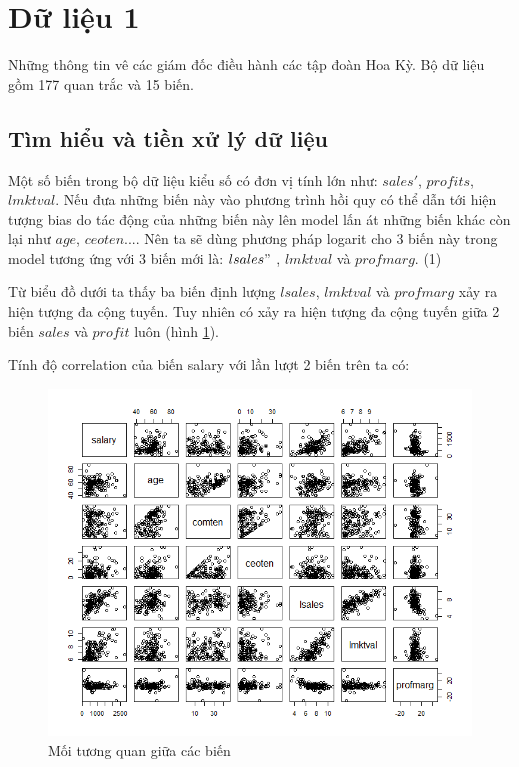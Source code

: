 \section{Dữ liệu 1}
Những thông tin vê các giám đốc điều hành các tập đoàn Hoa Kỳ. Bộ dữ liệu gồm 177 quan trắc và 15 biến.

\subsection*{Tìm hiểu và tiền xử lý dữ liệu}

Một số biến trong bộ dữ liệu kiểu số có đơn vị tính lớn như: $sales'$, $profits$, $lmktval$. Nếu đưa những biến này vào phương trình hồi quy có thể dẫn tới hiện tượng bias do tác động của những biến này lên model lấn át những biến khác còn lại như $age$, $ceoten$.... Nên ta sẽ dùng phương pháp logarit cho 3 biến này trong model tương ứng với 3 biến mới là:  $lsales"$ , $lmktval$   và $profmarg$. (1)


Từ biểu đồ dưới ta thấy ba biến định lượng $\textit{lsales}$, $\textit{lmktval}$ và $\textit{profmarg}$ xảy ra hiện tượng đa cộng tuyến.
Tuy nhiên có xảy ra hiện tượng đa cộng tuyến giữa 2 biến $sales$ và $profit$ luôn (hình \ref{fig-b1:plot-vars}).

Tính độ correlation của biến salary với lần lượt 2 biến trên ta có:

\begin{figure}[H]
	\centering
	\includegraphics[scale = 0.7]{../Photo Of Result/B1_plotVriables.png}  
	\caption{Mối tương quan giữa các biến}
	\label{fig-b1:plot-vars}
\end{figure}

